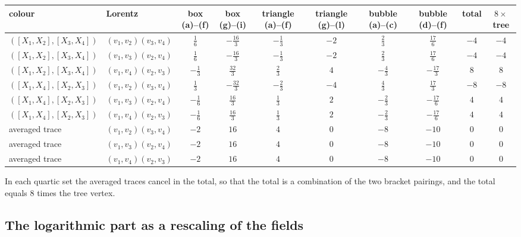 \begin{tabular}{l|l|c|c|c|c|c|c|c|c}
colour & Lorentz & box (a)--(f) & box (g)--(i) & triangle (a)--(f) & triangle (g)--(l) & bubble (a)--(c) & bubble (d)--(f) & total & $8\times$tree \\
\hline
$([X_1,X_2],[X_3,X_4])$ & $(v_1,v_2)(v_3,v_4)$ & $\tfrac{1}{6}$ & $-\tfrac{16}{3}$ & $-\tfrac{1}{3}$ & $-2$ & $\tfrac{2}{3}$ & $\tfrac{17}{6}$ & $-4$ & $-4$ \\
$([X_1,X_2],[X_3,X_4])$ & $(v_1,v_3)(v_2,v_4)$ & $\tfrac{1}{6}$ & $-\tfrac{16}{3}$ & $-\tfrac{1}{3}$ & $-2$ & $\tfrac{2}{3}$ & $\tfrac{17}{6}$ & $-4$ & $-4$ \\
$([X_1,X_2],[X_3,X_4])$ & $(v_1,v_4)(v_2,v_3)$ & $-\tfrac{1}{3}$ & $\tfrac{32}{3}$ & $\tfrac{2}{3}$ & $4$ & $-\tfrac{4}{3}$ & $-\tfrac{17}{3}$ & $8$ & $8$ \\
$([X_1,X_4],[X_2,X_3])$ & $(v_1,v_2)(v_3,v_4)$ & $\tfrac{1}{3}$ & $-\tfrac{32}{3}$ & $-\tfrac{2}{3}$ & $-4$ & $\tfrac{4}{3}$ & $\tfrac{17}{3}$ & $-8$ & $-8$ \\
$([X_1,X_4],[X_2,X_3])$ & $(v_1,v_3)(v_2,v_4)$ & $-\tfrac{1}{6}$ & $\tfrac{16}{3}$ & $\tfrac{1}{3}$ & $2$ & $-\tfrac{2}{3}$ & $-\tfrac{17}{6}$ & $4$ & $4$ \\
$([X_1,X_4],[X_2,X_3])$ & $(v_1,v_4)(v_2,v_3)$ & $-\tfrac{1}{6}$ & $\tfrac{16}{3}$ & $\tfrac{1}{3}$ & $2$ & $-\tfrac{2}{3}$ & $-\tfrac{17}{6}$ & $4$ & $4$ \\
averaged trace & $(v_1,v_2)(v_3,v_4)$ & $-2$ & $16$ & $4$ & $0$ & $-8$ & $-10$ & $0$ & $0$ \\
averaged trace & $(v_1,v_3)(v_2,v_4)$ & $-2$ & $16$ & $4$ & $0$ & $-8$ & $-10$ & $0$ & $0$ \\
averaged trace & $(v_1,v_4)(v_2,v_3)$ & $-2$ & $16$ & $4$ & $0$ & $-8$ & $-10$ & $0$ & $0$ \\
\end{tabular}

In each quartic set the averaged traces cancel in the total, so that the total is a combination of the two bracket pairings, and the total equals $8$ times the tree vertex.

\subsection{The logarithmic part as a rescaling of the fields}

